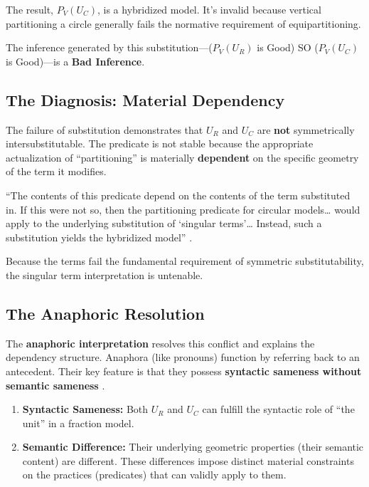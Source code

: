 \documentclass[12pt]{book}
\begin{document}
The result, \(P_V(U_C)\), is a hybridized model. It's invalid because vertical partitioning a circle generally fails the normative requirement of equipartitioning.

The inference generated by this substitution---(\(P_V(U_R)\) is Good) SO (\(P_V(U_C)\) is Good)---is a \textbf{Bad Inference}.

\subsection*{The Diagnosis: Material Dependency}\label{the-diagnosis-material-dependency}

The failure of substitution demonstrates that \(U_R\) and \(U_C\) are \textbf{not} symmetrically intersubstitutable. The predicate is not stable because the appropriate actualization of ``partitioning'' is materially \textbf{dependent} on the specific geometry of the term it modifies.

``The contents of this predicate depend on the contents of the term substituted in. If this were not so, then the partitioning predicate for circular models\ldots{} would apply to the underlying substitution of `singular terms'\ldots{} Instead, such a substitution yields the hybridized model'' \parencite[235]{savich2022}.

Because the terms fail the fundamental requirement of symmetric substitutability, the singular term interpretation is untenable.

\subsection*{The Anaphoric Resolution}\label{the-anaphoric-resolution}

The \textbf{anaphoric interpretation} resolves this conflict and explains the dependency structure. Anaphora (like pronouns) function by referring back to an antecedent. Their key feature is that they possess \textbf{syntactic sameness without semantic sameness} \parencite[235]{savich2022}.

\begin{enumerate}
\def\labelenumi{\arabic{enumi}.}
\item
  \textbf{Syntactic Sameness:} Both \(U_R\) and \(U_C\) can fulfill the syntactic role of ``the unit'' in a fraction model.
\item
  \textbf{Semantic Difference:} Their underlying geometric properties (their semantic content) are different. These differences impose distinct material constraints on the practices (predicates) that can validly apply to them.
\end{enumerate}
\end{document}
